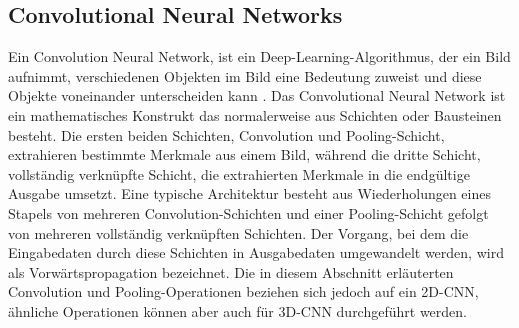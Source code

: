 \documentclass[paper=A4,pagesize=auto,12pt,headinclude=true,footinclude=true,BCOR=0mm,DIV=calc]{scrartcl}
\begin{document}
\subsection{Convolutional Neural Networks}\label{subsec:CNN} %
Ein Convolution Neural Network, ist ein Deep-Learning-Algorithmus, der ein Bild aufnimmt, verschiedenen Objekten im Bild eine Bedeutung zuweist und diese Objekte voneinander unterscheiden kann \cite{cnn1}. Das Convolutional Neural Network ist ein mathematisches Konstrukt das normalerweise aus Schichten oder Bausteinen besteht. Die ersten beiden Schichten, Convolution und Pooling-Schicht, extrahieren bestimmte Merkmale aus einem Bild, während die dritte Schicht, vollständig verknüpfte Schicht, die extrahierten Merkmale in die endgültige Ausgabe umsetzt. Eine typische Architektur besteht aus Wiederholungen eines Stapels von mehreren Convolution-Schichten und einer Pooling-Schicht gefolgt von mehreren vollständig verknüpften Schichten. Der Vorgang, bei dem die Eingabedaten durch diese Schichten in Ausgabedaten umgewandelt werden, wird als Vorwärtspropagation bezeichnet. Die in diesem Abschnitt erläuterten Convolution und Pooling-Operationen beziehen sich jedoch auf ein 2D-CNN, ähnliche Operationen können aber auch für 3D-CNN durchgeführt werden. \cite{cnn2}
\end{document}
